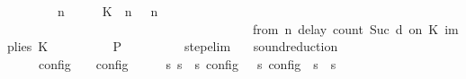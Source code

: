 \begin{isabellebody}
\ \ \ \ \ \ \ {\isacartoucheopen}{\isacharparenleft}{\isasymGamma}\ n\ {\isasymturnstile}\ {\isasymPsi}\ {\isasymtriangleright}\ {\isasymPhi}\ {\isacharequal}\ {\isacharparenleft}{\isacharparenleft}{\isacharparenleft}K\ {\isasymUp}\ n{\isacharparenright}\ {\isacharhash}\ {\isasymGamma}{\isacharparenright}{\isacharcomma}\ n\isanewline
\ \ \ \ \ \ \ \ \ \ \ \ \ \ \ \ \ \ \ \ \ \ \ \ \ \ \ \ \ \ \ \ \ \ \ \ {\isasymturnstile}\ {\isasymPsi}\ {\isasymtriangleright}\ {\isacharparenleft}{\isacharparenleft}from\ n\ delay\ count\ Suc\ d\ on\ K\ implies\ K\ {\isacharhash}\ {\isasymPhi}{\isacharparenright}{\isacharparenright}{\isacartoucheclose}\isanewline
\ \ \ \ \ \ \isamarkupfalse%
\ {\isacharquery}P\ \isamarkupfalse%
\isanewline
\ \ \ \ \isamarkupfalse%
\isanewline
\ \ \isamarkupfalse%
\isanewline
{}\isamarkupfalse%
%
\endisatagproof
{\isafoldproof}%
%
\isadelimproof
\isanewline
%
\endisadelimproof
\isanewline
{}\isamarkupfalse%
\ step{\isacharunderscore}elim{\isacharcolon}{\isacartoucheopen}{\isasymS}\ {\isasymhookrightarrow}\ {\isasymS}\isanewline
\isanewline
{}\isamarkupfalse%
\ sound{\isacharunderscore}reduction{\isacharprime}{\isacharcolon}\isanewline
\ \ \ {\isacartoucheopen}{\isasymS}\ {\isasymhookrightarrow}\ {\isasymS}\isanewline
\ \ \ {\isacartoucheopen}{\isasymlbrakk}\ {\isasymS}\ {\isasymrbrakk}\isactrlsub c\isactrlsub o\isactrlsub n\isactrlsub f\isactrlsub i\isactrlsub g\ {\isasymsupseteq}\ {\isasymlbrakk}\ {\isasymS}\ {\isasymrbrakk}\isactrlsub c\isactrlsub o\isactrlsub n\isactrlsub f\isactrlsub i\isactrlsub g{\isacartoucheclose}\isanewline
%
\isadelimproof
%
\endisadelimproof
%
\isatagproof
{}\isamarkupfalse%
\ {\isacharminus}\isanewline
\ \ \isamarkupfalse%
\ {\isacartoucheopen}{\isasymforall}s\ s\ {\isacharparenleft}{\isasymlbrakk}\ s\ {\isasymrbrakk}\isactrlsub c\isactrlsub o\isactrlsub n\isactrlsub f\isactrlsub i\isactrlsub g\ {\isasymsubseteq}\ {\isasymlbrakk}\ s\ {\isasymrbrakk}\isactrlsub c\isactrlsub o\isactrlsub n\isactrlsub f\isactrlsub i\isactrlsub g{\isacharparenright}\ {\isasymor}\ {\isasymnot}{\isacharparenleft}s\ {\isasymhookrightarrow}\ s\isanewline

\end{isabellebody}
